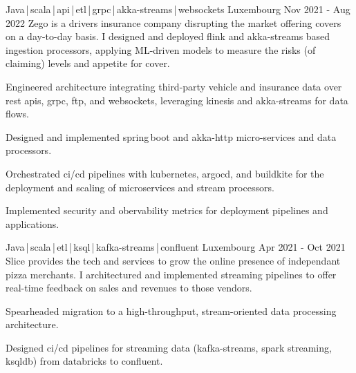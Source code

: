 \begin{cventries}

    \cventry
    {Java\,|\,scala\,|\,api\,|\,etl\,|\,grpc\,|\,akka-streams\,|\,websockets}
    {} 
    {Luxembourg}
    {Nov 2021 - Aug 2022}
    {Zego is a drivers insurance company disrupting the market offering covers on a day-to-day basis. I designed and deployed flink and akka-streams based ingestion processors, applying ML-driven models to measure the risks (of claiming) levels and appetite for cover.}
    {
        \begin{cvitems}
            \item{Engineered architecture integrating third-party vehicle and insurance data over rest apis, grpc, ftp, and websockets, leveraging kinesis and akka-streams for data flows.}
            \item{Designed and implemented spring\,boot and akka-http micro-services and data processors.}
            \item{Orchestrated ci/cd pipelines with kubernetes, argocd, and buildkite for the deployment and scaling of microservices and stream processors.}
            \item{Implemented security and obervability metrics for deployment pipelines and applications.}
        \end{cvitems}
    }


    \cventry
    {Java\,|\,scala\,|\,etl\,|\,ksql\,|\,kafka-streams\,|\,confluent}
    {} 
    {Luxembourg}
    {Apr 2021 - Oct 2021}
    {Slice provides the tech and services to grow the online presence of independant pizza merchants. I architectured and implemented streaming pipelines to offer real-time feedback on sales and revenues to those vendors.}
    {
        \begin{cvitems}
            \item{Spearheaded migration to a high-throughput, stream-oriented data processing architecture.}
            \item{Designed ci/cd pipelines for streaming data (kafka-streams, spark streaming, ksqldb) from databricks to confluent.}
        \end{cvitems}
    }


\end{cventries}
